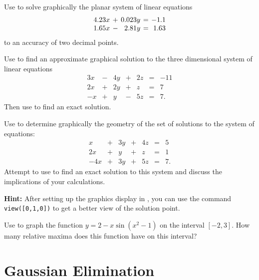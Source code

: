 \begin{exercise} \label{c2.2.2}
Use \Matlab to solve graphically the planar system of linear
equations
\[
\arraycolsep 2pt
\begin{array}{rcrcr}
4.23x & + & 0.023y & = & -1.1 \\
1.65x & - & 2.81y & = &  1.63
\end{array}
\]
to an accuracy of two decimal points.
\end{exercise}


\begin{exercise} \label{c2.2.3}
Use \Matlab to find an approximate graphical solution to the
three dimensional system of linear equations
\[
\begin{array}{rcrcrcr}
 3x & - & 4y & + & 2z  & = & -11\\
 2x & + & 2y & + &  z  & = &   7\\
 -x & + &  y & - & 5z  & = &   7.
\end{array}
\]
Then use \Matlab to find an exact solution.
\end{exercise}


\begin{exercise} \label{c2.2.4}
Use \Matlab to determine graphically the geometry of the set of
solutions to the system of equations:
\[
\begin{array}{rcrcrcr}
  x & + & 3y & + & 4z  & = & 5\\
 2x & + &  y & + &  z  & = & 1\\
-4x & + & 3y & + & 5z  & = & 7.
\end{array}
\]
Attempt to use \Matlab to find an exact solution to this system
and discuss the implications of your calculations.

{\bf Hint:} After setting up the graphics display in \Matlabp,
you can use the command {\tt view([0,1,0])}  to get
a better view of the solution point.
\end{exercise}

\begin{exercise} \label{c2.2.a5}
Use \Matlab to graph the function $y = 2 - x\sin(x^2-1)$ on the interval
$[-2,3]$.  How many relative maxima does this function have on this interval?
\end{exercise}


\section{Gaussian Elimination}  \label{S:Gauss}

